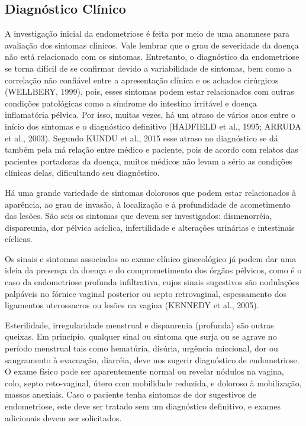 \documentclass[12pt]{article} %
\begin{document}
\newpage

\subsection{Diagnóstico Clínico}

A investigação inicial da endometriose é feita por meio de uma
anamnese para avaliação dos sintomas clínicos. Vale lembrar que o grau
de severidade da doença não está relacionado com os sintomas.
Entretanto, o diagnóstico da endometriose se torna difícil de se
confirmar devido a variabilidade de sintomas, bem como a correlação
não confiável entre a apresentação clínica e os achados cirúrgicos
(WELLBERY, 1999), pois, esses sintomas podem estar relacionados com
outras condições patológicas como a síndrome do intestino irritável e
doença inflamatória pélvica. Por isso, muitas vezes, há um atraso de
vários anos entre o início dos sintomas e o diagnóstico definitivo
(HADFIELD et al., 1995; ARRUDA et al., 2003). Segundo KUNDU et al.,
2015 esse atraso no diagnóstico se dá também pela má relação entre
médico e paciente, pois de acordo com relatos das pacientes portadoras
da doença, muitos médicos não levam a sério as condições clínicas
delas, dificultando seu diagnóstico.

Há uma grande variedade de sintomas dolorosos que podem estar
relacionados à aparência, ao grau de invasão, à localização e à
profundidade de acometimento das lesões. São seis os sintomas que
devem ser investigados: dismenorréia, dispareunia, dor pélvica
acíclica, infertilidade e alterações urinárias e intestinais cíclicas.

Os sinais e sintomas associados ao exame clínico ginecológico já podem
dar uma ideia da presença da doença e do comprometimento dos órgãos
pélvicos, como é o caso da endometriose profunda infiltrativa, cujos
sinais sugestivos são nodulações palpáveis no fórnice vaginal
posterior ou septo retrovaginal, espessamento dos ligamentos
uterossacros ou lesões na vagina (KENNEDY et al., 2005).

Esterilidade, irregularidade menstrual e dispaurenia (profunda) são
outras queixas. Em princípio, qualquer sinal ou sintoma que surja ou
se agrave no período menstrual tais como hematúria, disúria,
urgência miccional, dor ou sangramento à evacuação,
diarréia, deve nos sugerir diagnóstico de endometriose. O exame físico
pode ser aparentemente normal ou revelar nódulos na vagina, colo,
septo reto-vaginal, útero com
mobilidade reduzida, e doloroso à mobilização, massas anexiais. Caso o paciente tenha sintomas de dor sugestivos de endometriose,
este deve ser tratado sem um diagnóstico definitivo, e exames
adicionais devem ser solicitados.
 
\end{document}
